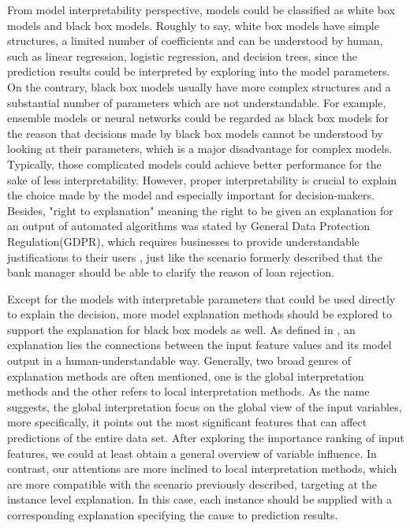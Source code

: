 From model interpretability perspective, models could be classified as white box models and black box models. Roughly to say, white box models have simple structures, a limited number of coefficients and can be understood by human, such as linear regression, logistic regression, and decision trees, since the prediction results could be interpreted by exploring into the model parameters. On the contrary, black box models usually have more complex structures and a substantial number of parameters which are not understandable. For example, ensemble models or neural networks could be regarded as black box models for the reason that decisions made by black box models cannot be understood by looking at their parameters, which is a major disadvantage for complex models. Typically, those complicated models could achieve better performance for the sake of less interpretability. However, proper interpretability is crucial to explain the choice made by the model and especially important for decision-makers. Besides, "right to explanation" meaning the right to be given an explanation for an output of automated algorithms was stated by General Data Protection Regulation(GDPR), which requires businesses to provide understandable justifications to their users \cite{voigt2017eu}, just like the scenario formerly described that the bank manager should be able to clarify the reason of loan rejection. 

Except for the models with interpretable parameters that could be used directly to explain the decision, more model explanation methods should be explored to support the explanation for black box models as well. As defined in \cite{molnar2019}, an explanation lies the connections between the input feature values and its model output in a human-understandable way. Generally, two broad genres of explanation methods are often mentioned, one is the global interpretation methods and the other refers to local interpretation methods. As the name suggests, the global interpretation focus on the global view of the input variables, more specifically, it points out the most significant features that can affect predictions of the entire data set. After exploring the importance ranking of input features, we could at least obtain a general overview of variable influence. In contrast, our attentions are more inclined to local interpretation methods, which are more compatible with the scenario previously described, targeting at the instance level explanation. In this case, each instance should be supplied with a corresponding explanation specifying the cause to prediction results. 

